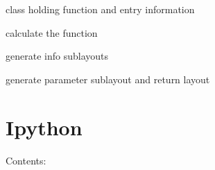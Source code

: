 \documentclass[letterpaper,10pt,english]{sphinxmanual}
\begin{document}
\begin{fulllineitems}
\label{AuxillaryFunctionWidget:Auxfuncwidget.AuxillaryFunctionWidget}
class holding function and entry information

\begin{fulllineitems}
\label{AuxillaryFunctionWidget:Auxfuncwidget.AuxillaryFunctionWidget.calculate}
calculate the function

\end{fulllineitems}


\begin{fulllineitems}
\label{AuxillaryFunctionWidget:Auxfuncwidget.AuxillaryFunctionWidget.generate_info_widgets}
generate info sublayouts

\end{fulllineitems}


\begin{fulllineitems}
\label{AuxillaryFunctionWidget:Auxfuncwidget.AuxillaryFunctionWidget.generate_params_widgets}
generate parameter sublayout and return layout

\end{fulllineitems}


\begin{fulllineitems}
\label{AuxillaryFunctionWidget:Auxfuncwidget.AuxillaryFunctionWidget.get_params}
\end{fulllineitems}


\end{fulllineitems}



\chapter{Ipython}
\label{Ipython::doc}\label{Ipython:ipython}
Contents:
\end{document}
